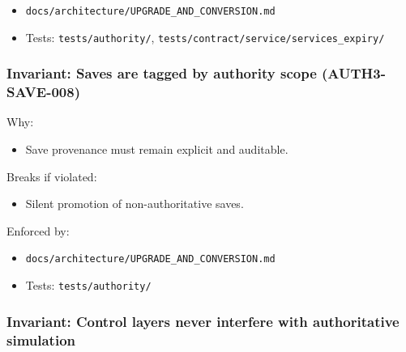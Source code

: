 \documentclass[9pt,a4paper,openany]{book}
\begin{document}
\begin{itemize}
\item \texttt{docs/\allowbreak{}architecture/\allowbreak{}UPGRADE\_\allowbreak{}AND\_\allowbreak{}CONVERSION.\allowbreak{}md}
\end{itemize}


\begin{itemize}
\item Tests: \texttt{tests/\allowbreak{}authority/\allowbreak{}}, \texttt{tests/\allowbreak{}contract/\allowbreak{}service/\allowbreak{}services\_\allowbreak{}expiry/\allowbreak{}}
\end{itemize}





\subsubsection{Invariant: Saves are tagged by authority scope (AUTH3-SAVE-008)}


Why:



\begin{itemize}
\item Save provenance must remain explicit and auditable.\allowbreak{}
\end{itemize}


Breaks if violated:



\begin{itemize}
\item Silent promotion of non-\allowbreak{}authoritative saves.\allowbreak{}
\end{itemize}


Enforced by:



\begin{itemize}
\item \texttt{docs/\allowbreak{}architecture/\allowbreak{}UPGRADE\_\allowbreak{}AND\_\allowbreak{}CONVERSION.\allowbreak{}md}
\end{itemize}


\begin{itemize}
\item Tests: \texttt{tests/\allowbreak{}authority/\allowbreak{}}
\end{itemize}





\subsubsection{Invariant: Control layers never interfere with authoritative simulation}
\end{document}
